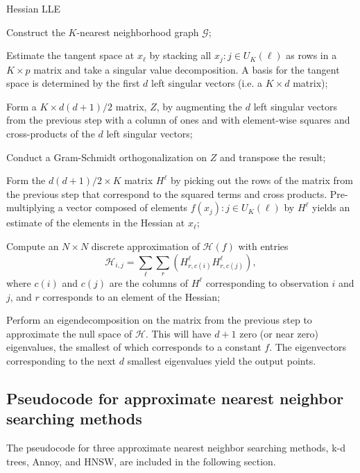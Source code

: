 \begin{algorithm}[!htb]
  \caption{Hessian LLE}
  \label{alg:hlle}
  \begin{algorithmic}[1]

  \STATE Construct the $K$-nearest neighborhood graph $\mathcal{G}$;


  \STATE Estimate the tangent space at $x_\ell$ by stacking all $x_j:j\in U_K(\ell)$ as rows in a $K\times p$ matrix and take a singular value decomposition. A basis for the tangent space is determined by the first $d$ left singular vectors (i.e. a $K\times d$ matrix);

  \STATE Form a $K\times d(d+1)/2$ matrix, $Z$, by augmenting the $d$ left singular vectors from the previous step with a column of ones and with element-wise squares and cross-products of the $d$ left singular vectors;

  \STATE Conduct a Gram-Schmidt orthogonalization on $Z$ and transpose the result;

  \STATE Form the $d(d+1)/2\times K$ matrix $H^\ell$ by picking out the rows of the matrix from the previous step that correspond to the squared terms and cross products. Pre-multiplying a vector composed of elements $f(x_j):j\in U_K(\ell)$ by $H^\ell$ yields an estimate of the elements in the Hessian at $x_\ell$;

  \ENDFOR

  \STATE Compute an $N\times N$ discrete approximation of $\mathcal{H}(f)$ with entries
  $$
    \mathcal{H}_{i,j} = \sum_\ell \sum_r (H^\ell_{r,c(i)} H^\ell_{r,c(j)}),
  $$
  where $c(i)$ and $c(j)$ are the columns of $H^\ell$ corresponding to observation $i$ and $j$, and $r$ corresponds to an element of the Hessian;

  \STATE  Perform an eigendecomposition on the matrix from the previous step to approximate the null space of $\mathcal{H}$. This will have $d+1$ zero (or near zero) eigenvalues, the smallest of which corresponds to a constant $f$. The eigenvectors corresponding to the next $d$ smallest eigenvalues yield the output points.

  \end{algorithmic}
\end{algorithm}

\clearpage
\FloatBarrier

\subsection{Pseudocode for approximate nearest neighbor searching methods}
\label{sec:annalg}
The pseudocode for three approximate nearest neighbor searching methods, k-d trees, Annoy, and HNSW, are included in the following section.

